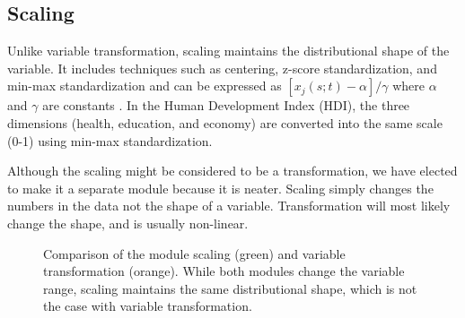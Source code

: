 \documentclass[
]{interact}
\begin{document}
\subsection{Scaling}\label{scaling}

Unlike variable transformation, scaling maintains the distributional
shape of the variable. It includes techniques such as centering, z-score
standardization, and min-max standardization and can be expressed as
\([x_{j}(s;t) - \alpha]/\gamma\) where \(\alpha\) and \(\gamma\) are
constants . In the Human Development Index (HDI), the three dimensions
(health, education, and economy) are converted into the same scale (0-1)
using min-max standardization.

Although the scaling might be considered to be a transformation, we have
elected to make it a separate module because it is neater. Scaling
simply changes the numbers in the data not the shape of a variable.
Transformation will most likely change the shape, and is usually
non-linear.

\begin{figure}


\caption{\label{fig-scale-var-trans-compare}Comparison of the module
scaling (green) and variable transformation (orange). While both modules
change the variable range, scaling maintains the same distributional
shape, which is not the case with variable transformation.}

\end{figure}%
\end{document}
